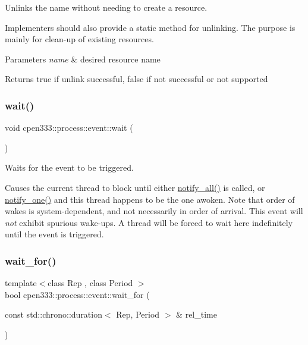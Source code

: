 Unlinks the name without needing to create a resource. 

Implementers should also provide a static method for unlinking. The purpose is mainly for clean-\/up of existing resources.


\begin{DoxyParams}{Parameters}
{\em name} & desired resource name \\
\hline
\end{DoxyParams}
\begin{DoxyReturn}{Returns}
{\ttfamily true} if unlink successful, {\ttfamily false} if not successful or not supported 
\end{DoxyReturn}
\mbox{\label{classcpen333_1_1process_1_1event_ae02584676aa834eef81b74d01ceb3ea5}} 
\subsubsection{\texorpdfstring{wait()}{wait()}}
{\footnotesize\ttfamily void cpen333\+::process\+::event\+::wait (\begin{DoxyParamCaption}{ }\end{DoxyParamCaption})\hspace{0.3cm}{\ttfamily [inline]}}



Waits for the event to be triggered. 

Causes the current thread to block until either {\ttfamily \hyperlink{classcpen333_1_1process_1_1event_a80184c9e2762fb1a0d7f3a9ff6ae27e7}{notify\+\_\+all()}} is called, or {\ttfamily \hyperlink{classcpen333_1_1process_1_1event_a47077325cc6cb29df3aba00de683ce42}{notify\+\_\+one()}} and this thread happens to be the one awoken. Note that order of wakes is system-\/dependent, and not necessarily in order of arrival. This event will {\itshape not} exhibit spurious wake-\/ups. A thread will be forced to wait here indefinitely until the event is triggered. \mbox{\label{classcpen333_1_1process_1_1event_a9b887906af309ccc8687cb91f3c66b25}} 
\subsubsection{\texorpdfstring{wait\+\_\+for()}{wait\_for()}}
{\footnotesize\ttfamily template$<$class Rep , class Period $>$ \\
bool cpen333\+::process\+::event\+::wait\+\_\+for (\begin{DoxyParamCaption}\item[{const std\+::chrono\+::duration$<$ Rep, Period $>$ \&}]{rel\+\_\+time }\end{DoxyParamCaption})\hspace{0.3cm}{\ttfamily [inline]}}



